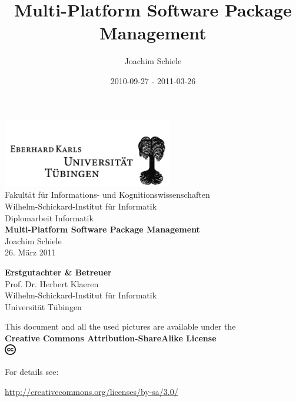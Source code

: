 \documentclass[a4paper,10pt]{article}
\title{Multi-Platform Software Package Management}
\author{Joachim Schiele}
\date{2010-09-27 - 2011-03-26}
\begin{document}
\begin{titlepage}
	\begin{center}
		\includegraphics[height=3cm]{images/logo-uni-tuebingen.pdf}\\
		{\large			Fakult\"at f\"ur Informations- und Kognitionswissenschaften\\
								Wilhelm-Schickard-Institut f\"ur Informatik\\[2cm]}
		{\large 		Diplomarbeit Informatik\\[0.2cm]}
		{\LARGE\bf	Multi-Platform Software Package Management \\[1.5cm]}
		{\large 		Joachim Schiele  }\\[0.5cm]
								26. M\"arz 2011\\[2.5cm]
		\begin{center}
			{\small\bf			Erstgutachter \& Betreuer}\\[0.5cm]
			{\large					Prof. Dr. Herbert Klaeren}\\[0.2cm]
			{\footnotesize	Wilhelm-Schickard-Institut f\"ur Informatik\\
											Universit\"at T\"ubingen}\\[1.5cm]
		\end{center}
		\begin{center}

\vfill

This document and all the used pictures are available under the \\ \textbf{Creative Commons Attribution-ShareAlike License}\\

		\includegraphics[height=0.5cm]{images/cc.png}

For details see:

\url{http://creativecommons.org/licenses/by-sa/3.0/}

		\end{center}
	\end{center}
\end{titlepage}
\newpage
\tableofcontents
\newpage
\end{document}
